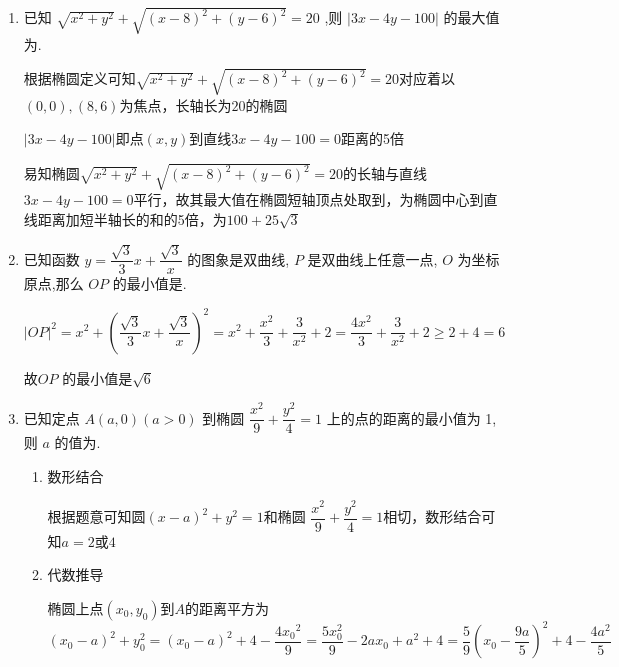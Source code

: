 \begin{enumerate}
\begin{jieda}
        因为$P$在圆上，因此数形结合可知$k \in [-4, 6]$（相切时取得最值），故$[-4, 6] \subseteq [-a, 9]$，因此$a \geq 4$
    \end{jieda}
    \item 已知 $\sqrt{{x}^{2} + {y}^{2}} + \sqrt{{\left( x - 8\right) }^{2} + {\left( y - 6\right) }^{2}} = {20}$ ,则 $\left| {{3x} - {4y} - {100}}\right|$ 的最大值为.
    \begin{jieda}
        根据椭圆定义可知$\sqrt{{x}^{2} + {y}^{2}} + \sqrt{{\left( x - 8\right) }^{2} + {\left( y - 6\right) }^{2}} = {20}$对应着以$(0, 0), (8, 6)$为焦点，长轴长为$20$的椭圆

        $\left| {{3x} - {4y} - {100}}\right|$即点$(x, y)$到直线$3x - {4y} - 100 = 0$距离的5倍

        易知椭圆$\sqrt{{x}^{2} + {y}^{2}} + \sqrt{{\left( x - 8\right) }^{2} + {\left( y - 6\right) }^{2}} = {20}$的长轴与直线$3x - {4y} - 100 = 0$平行，故其最大值在椭圆短轴顶点处取到，为椭圆中心到直线距离加短半轴长的和的5倍，为$100+25\sqrt{3}$
    \end{jieda}
    \item 已知函数 $y = \dfrac{\sqrt{3}}{3}x + \dfrac{\sqrt{3}}{x}$ 的图象是双曲线, $P$ 是双曲线上任意一点, $O$ 为坐标原点,那么 ${OP}$ 的最小值是.
    \begin{jieda}
        $|OP|^2 = x^2 + \left(\dfrac{\sqrt{3}}{3}x + \dfrac{\sqrt{3}}{x}\right)^2 = x^2 + \dfrac{x^2}{3} + \dfrac{3}{x^2} + 2 = \dfrac{4x^2}{3} + \dfrac{3}{x^2} + 2 \geq 2 + 4 = 6$

        故${OP}$ 的最小值是$\sqrt{6}$
    \end{jieda}
    \item 已知定点 $A\left( {a,0}\right) \left( {a > 0}\right)$ 到椭圆 $\dfrac{{x}^{2}}{9} + \dfrac{{y}^{2}}{4} = 1$ 上的点的距离的最小值为 1,则 $a$ 的值为.
    \begin{jieda}
        \begin{enumerate}
            \item 数形结合

            根据题意可知圆$(x-a)^2+y^2 = 1$和椭圆 $\dfrac{{x}^{2}}{9} + \dfrac{{y}^{2}}{4} = 1$相切，数形结合可知$a = 2$或$4$

            \item 代数推导

            椭圆上点$(x_0, y_0)$到$A$的距离平方为$(x_0-a)^2+y_0^2 = (x_0-a)^2 + 4 - \dfrac{4{x_0}^{2}}{9} = \dfrac{5x_0^2}{9} - 2ax_0 + a^2+4 = \dfrac{5}{9}\left(x_0 - \dfrac{9a}{5}\right)^2+4-\dfrac{4a^{2}}{5}$


\end{enumerate}
\end{jieda}
\end{enumerate}
